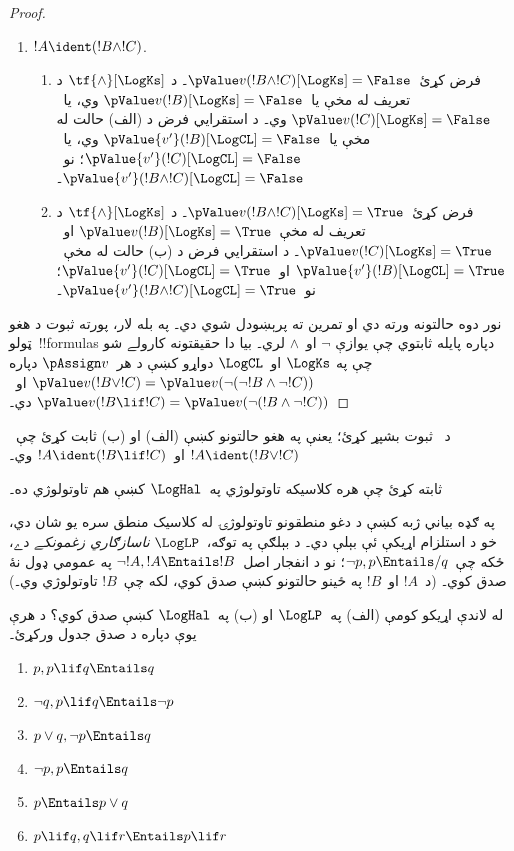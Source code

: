 \documentclass[../../../include/open-logic-section]{subfiles}
\begin{document}
\begin{proof}
\begin{enumerate}
    \item $!A \ident (!B \land !C)$.
    \begin{enumerate}
      \item فرض کړئ~$\pValue v(!B \land !C)[\LogKs] = \False$۔ د
      $\tf{\land}[\LogKs]$ د تعريف له مخې يا~$\pValue v(!B)[\LogKs]  =
      \False$ وي، يا~$\pValue v(!C)[\LogKs]  = \False$ وي۔ د
      استقرايي فرض د (الف) حالت له مخې يا~$\pValue {v'}(!B)[\LogCL]  = \False$
      وي، يا~$\pValue {v'}(!C)[\LogCL]  = \False$؛ نو~$\pValue {v'}(!B \land
      !C)[\LogCL] = \False$۔
      \item فرض کړئ~$\pValue v(!B \land !C)[\LogKs] = \True$۔ د
      $\tf{\land}[\LogKs]$ د تعريف له مخې~$\pValue v(!B)[\LogKs]  =
      \True$ او~$\pValue v(!C)[\LogKs]  = \True$۔ د
      استقرايي فرض د (ب) حالت له مخې~$\pValue {v'}(!B)[\LogCL]  = \True$
      او~$\pValue {v'}(!C)[\LogCL]  = \True$؛ نو~$\pValue {v'}(!B \land
      !C)[\LogCL] = \True$۔
    \end{enumerate}
  \end{enumerate}

  نور دوه حالتونه ورته دي او تمرين ته پرېښودل شوي دي۔ په بله لار،
  پورته ثبوت د هغو ټولو~!!{formula}s دپاره پايله ثابتوي چې يوازې
  $\lnot$ او~$\land$ لري۔ بيا دا حقيقتونه کارولے شو چې په
  $\LogKs$ او~$\LogCL$ دواړو کښې د هر~$\pAssign v$ دپاره
  $\pValue v(!B \lor
  !C) = \pValue v(\lnot(\lnot!B \land \lnot !C))$ او~$\pValue v(!B \lif
  !C) = \pValue v(\lnot(!B \land \lnot !C))$ دي۔
\end{proof}

\begin{prob}
  د~ ثبوت بشپړ کړئ؛ يعنې
  په هغو حالتونو کښې (الف) او (ب) ثابت کړئ چې~$!A \ident (!B \lor !C)$
  او~$!A \ident (!B \lif !C)$ وي۔
\end{prob}

\begin{prob}
ثابته کړئ چې هره کلاسيکه تاوتولوژي په~$\LogHal$ کښې هم تاوتولوژي ده۔
\end{prob}

په ګډه بياني ژبه کښې د دغو منطقونو تاوتولوژۍ له کلاسيک منطق سره يو شان دي،
خو د استلزام اړيکې ئې بېلې دي۔ د بېلګې په توګه،~$\LogLP$
\emph{ناسازګاري زغمونکے} دے، ځکه چې~$\lnot p, p \Entails/ q$؛
نو د انفجار اصل~$\lnot !A, !A \Entails !B$ په عمومي ډول نۀ صدق کوي۔
(د~$!A$ او~$!B$ په ځينو حالتونو کښې صدق کوي، لکه چې~$!B$
تاوتولوژي وي۔)

\begin{prob}
  له لاندې اړيکو کومې (الف) په~$\LogLP$ او (ب) په~$\LogHal$
  کښې صدق کوي؟ د هرې يوې دپاره د صدق جدول ورکړئ۔
  \begin{enumerate}
    \item $p, p \lif q \Entails q$
    \item $\lnot q, p \lif q \Entails \lnot p$
    \item $p \lor q, \lnot p \Entails q$
    \item $\lnot p, p \Entails q$
    \item $p \Entails p \lor q$
    \item $p \lif q, q\lif r \Entails p \lif r$
  \end{enumerate}
\end{prob}
\end{document}
